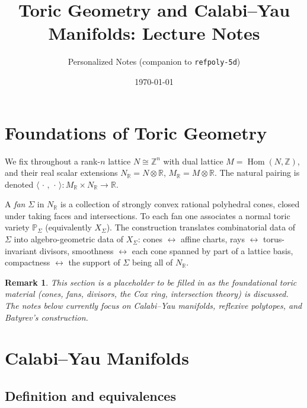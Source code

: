 \documentclass{amsart}
\title{Toric Geometry and Calabi--Yau Manifolds: Lecture Notes}
\author{Personalized Notes (companion to \texttt{refpoly-5d})}
\date{\today}
\newtheorem{remark}[theorem]{Remark}
\begin{document}
\maketitle
\tableofcontents

\section{Foundations of Toric Geometry}
We fix throughout a rank-$n$ lattice $N \cong \mathbb{Z}^n$ with dual lattice
$M = \operatorname{Hom}(N,\mathbb{Z})$, and their real scalar extensions
$N_{\mathbb{R}} = N \otimes \mathbb{R}$, $M_{\mathbb{R}} = M \otimes \mathbb{R}$.
The natural pairing is denoted $\langle\,\cdot\,,\,\cdot\,\rangle : M_{\mathbb{R}} \times N_{\mathbb{R}} \to \mathbb{R}$.

A \emph{fan} $\Sigma$ in $N_{\mathbb{R}}$ is a collection of strongly convex
rational polyhedral cones, closed under taking faces and intersections.
To each fan one associates a normal toric variety $\mathbb{P}_\Sigma$
(equivalently $X_\Sigma$). The construction translates combinatorial
data of $\Sigma$ into algebro-geometric data of $X_\Sigma$:
cones $\leftrightarrow$ affine charts, rays $\leftrightarrow$ torus-invariant
divisors, smoothness $\leftrightarrow$ each cone spanned by part of a
lattice basis, compactness $\leftrightarrow$ the support of $\Sigma$ being
all of $N_{\mathbb{R}}$.

\begin{remark}
This section is a placeholder to be filled in as the foundational
toric material (cones, fans, divisors, the Cox ring, intersection theory)
is discussed. The notes below currently focus on Calabi--Yau manifolds,
reflexive polytopes, and Batyrev's construction.
\end{remark}

\section{Calabi--Yau Manifolds}

\subsection{Definition and equivalences}
\end{document}
